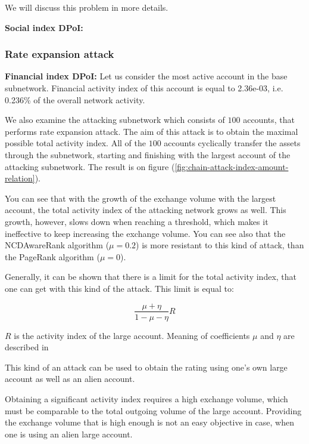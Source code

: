 \documentclass[a4paper,12pt]{article}
\begin{document}
We will discuss this problem in more details.

\textbf{Social index DPoI:}

\subsubsection{Rate expansion attack}

\textbf{Financial index DPoI:} Let us consider the most active account in the base subnetwork. Financial activity index of this account is equal to 2.36e-03, i.e. 0.236\% of the overall network activity. 

We also examine the attacking subnetwork which consists of $100$ accounts, that performs rate expansion attack. The aim of this attack is to obtain the maximal possible total activity index. All of the $100$ accounts cyclically transfer the assets through the subnetwork, starting and finishing with the largest account of the attacking subnetwork. The result is on figure (\ref{fig:chain-attack-index-amount-relation}).
 
You can see that with the growth of the exchange volume with the largest account, the total activity index of the attacking network grows as well. This growth, however, slows down when reaching a threshold, which makes it ineffective to keep increasing the exchange volume. You can see also that the NCDAwareRank algorithm ($\mu=0.2$) is more resistant to this kind of attack, than the PageRank algorithm ($\mu=0$).

Generally, it can be shown that there is a limit for the total activity index, that one can get with this kind of the attack. This limit is equal to:

 $$
 \frac{\mu+\eta}{1 - \mu - \eta} R
 $$ 
 
 $R$ is the activity index of the large account. Meaning of coefficients $\mu$ and $\eta$ are described in 

This kind of an attack can be used to obtain the rating using one's own large account as well as an alien account.

Obtaining a significant activity index requires a high exchange volume, which must be comparable to the total outgoing volume of the large account. Providing the exchange volume that is high enough is not an easy objective in case, when one is using an alien large account.
\end{document}
